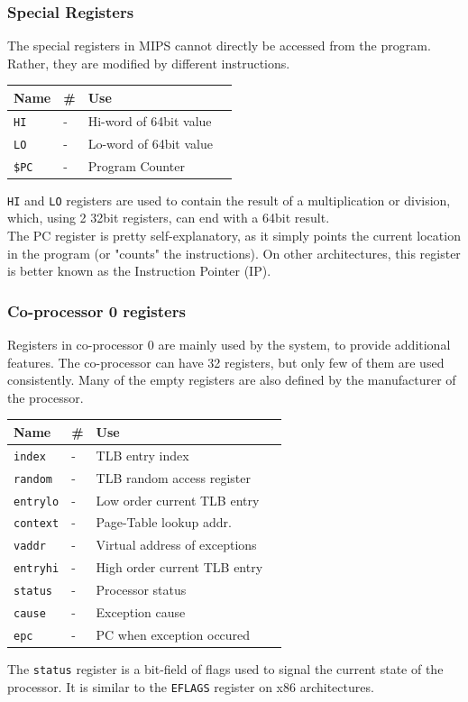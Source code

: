 \subsubsection{Special Registers}
The special registers in MIPS cannot directly be accessed from the program.
Rather, they are modified by different instructions.
\begin{center}
    \begin{tabular}{ | l | l | l | c |}
    \hline
	\textbf{Name} & \textbf{\#} & \textbf{Use} \\ \hline \hline
	\texttt{HI}		& -	& Hi-word of 64bit value \\ \hline
	\texttt{LO}		& -	& Lo-word of 64bit value \\ \hline
	\texttt{\$PC}		& -	& Program Counter \\ \hline
    \end{tabular}
\end{center}
\texttt{HI} and \texttt{LO} registers are used to contain the result of a
multiplication or division, which, using 2 32bit registers, can end with a
64bit result.\\
The PC register is pretty self-explanatory, as it simply points the current
location in the program (or "counts" the instructions). On other
architectures,
this register is better known as the Instruction Pointer (IP).

\subsubsection{Co-processor 0 registers}
Registers in co-processor 0 are mainly used by the system, to provide
additional features. The co-processor can have 32 registers, but only few of
them are used consistently. Many of the empty registers are also defined
by the
manufacturer of the processor.
\begin{center}
    \begin{tabular}{ | l | l | l | c |}
    \hline
	\textbf{Name} & \textbf{\#} & \textbf{Use} \\ \hline \hline
	\texttt{index}		& -	& TLB entry index\\ \hline
	\texttt{random}		& -	& TLB random access register \\ \hline
	\texttt{entrylo}	& -	& Low order current TLB entry \\
	\hline
	\texttt{context}	& -	& Page-Table lookup addr. \\ \hline
	\texttt{vaddr}		& -	& Virtual address of exceptions
	\\ \hline
	\texttt{entryhi}	& -	& High order current TLB entry\\
	\hline
	\texttt{status}		& -	& Processor status \\ \hline
	\texttt{cause}		& -	& Exception cause \\ \hline
	\texttt{epc}		& -	& PC when exception occured \\ \hline
    \end{tabular}
\end{center}
The \texttt{status} register is a bit-field of flags used to signal the
current
state of the processor. It is similar to the \texttt{EFLAGS} register on
x86 architectures.

